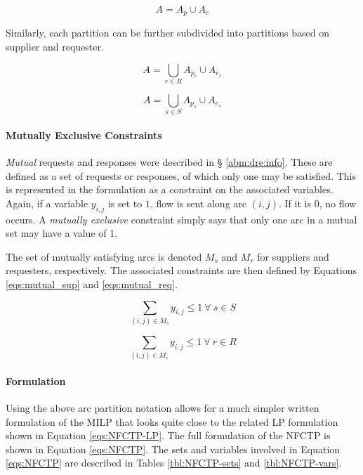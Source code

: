 \begin{equation}\label{eqs:arc-union}
  A = A_{p} \cup A_{e}
\end{equation}

Similarly, each partition can be further subdivided into partitions based on
supplier and requester. 

\begin{equation}\label{eqs:arc-union}
  A = \bigcup_{r \in R} A_{p_r} \cup A_{e_r}
\end{equation}

\begin{equation}\label{eqs:arc-union}
  A = \bigcup_{s \in S} A_{p_s} \cup A_{e_s}
\end{equation}

\paragraph{Mutually Exclusive Constraints}

\textit{Mutual} requests and responses were described in \S
\ref{abm:dre:info}. These are defined as a set of requests or responses, of
which only one may be satisfied. This is represented in the formulation as a
constraint on the associated variables. Again, if a variable $y_{i,j}$ is set to
$1$, flow is sent along arc $(i, j)$. If it is $0$, no flow occurs. A
\textit{mutually exclusive} constraint simply says that only one arc in a mutual
set may have a value of 1.

The set of mutually satisfying arcs is denoted $M_s$ and $M_r$ for suppliers and
requesters, respectively. The associated constraints are then defined by
Equations \ref{eqs:mutual_sup} and \ref{eqs:mutual_req}.

\begin{equation}\label{eqs:mutual_sup}
  \sum_{(i, j) \in M_{s}} y_{i,j} \leq 1 \: \forall \: s \in S 
\end{equation}

\begin{equation}\label{eqs:mutual_req}
  \sum_{(i, j) \in M_{r}} y_{i,j} \leq 1 \: \forall \: r \in R 
\end{equation}

\paragraph{Formulation}

Using the above arc partition notation allows for a much simpler written
formulation of the MILP that looks quite close to the related LP formulation
shown in Equation \ref{eqs:NFCTP-LP}. The full formulation of the NFCTP is shown
in Equation \ref{eqs:NFCTP}.  The sets and variables involved in Equation
\ref{eqs:NFCTP} are described in Tables \ref{tbl:NFCTP-sets} and
\ref{tbl:NFCTP-vars}.


